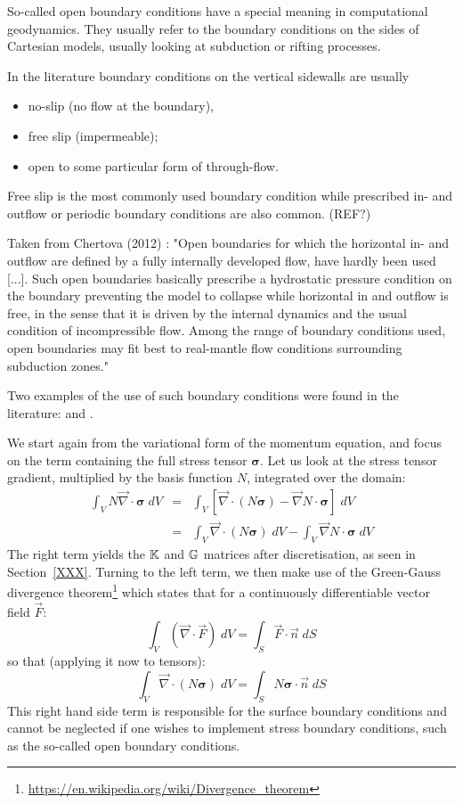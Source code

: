 So-called open boundary conditions have a special meaning in computational geodynamics. 
They usually refer to the boundary conditions on the sides of Cartesian models, 
usually looking at subduction or rifting processes. 

In the literature boundary conditions on the vertical sidewalls are usually 
\begin{itemize}
\item no-slip (no flow at the boundary), 
\item free slip (impermeable); 
\item open to some particular form of through-flow.
\end{itemize}

Free slip is the most commonly used boundary condition while prescribed in- and outflow 
or periodic boundary conditions are also common. (REF?)

Taken from Chertova \etal (2012) \cite{chgv12}:
"Open boundaries for which the horizontal in- and outflow are defined by a fully 
internally developed flow, have hardly been used [...]. 
Such open boundaries basically prescribe a hydrostatic pressure condition on 
the boundary preventing the model to collapse while horizontal in and outflow is free, 
in the sense that it is driven by the internal dynamics and the usual condition of 
incompressible flow. 
Among the range of boundary conditions used, open boundaries may fit best to 
real-mantle flow conditions surrounding subduction zones." 

Two examples of the use of such boundary conditions were found in 
the literature: \cite{qusp10} and \cite{chgv12}.

We start again from the variational form of the momentum equation, and focus on the term containing 
the full stress tensor ${\bm \sigma}$. 
Let us look at the stress tensor gradient, multiplied by the basis function $N$, integrated over the domain:
\begin{eqnarray}
\int_V N {\vec \nabla}\cdot {\bm \sigma} \; dV 
&=&\int_V \left[ {\vec \nabla}\cdot(N {\bm \sigma}) -{\vec \nabla}N \cdot {\bm \sigma}\right] \; dV \nonumber\\
&=& \int_V  {\vec \nabla}\cdot(N {\bm \sigma})\;  dV -\int_V  {\vec \nabla}N \cdot {\bm \sigma} \; dV
\end{eqnarray}
The right term yields the ${\mathbb{K}}$ and ${\mathbb{G}}$ matrices after discretisation, as seen in Section~\ref{XXX}.
Turning to the left term, we then make use of the Green-Gauss divergence 
theorem\footnote{\url{https://en.wikipedia.org/wiki/Divergence_theorem}} which states that for 
a continuously differentiable vector field $\vec{F}$:
\[
\int_V ({\vec \nabla} \cdot {\vec F})\; dV = \int _S {\vec F}\cdot {\vec n} \; dS
\]
so that (applying it now to tensors):
\[
\int_V  {\vec \nabla}\cdot(N {\bm \sigma})\;  dV =\int_S  N {\bm \sigma} \cdot {\vec n} \;  dS
\]
This right hand side term is responsible for the surface 
boundary conditions and cannot be neglected if one 
wishes to implement stress boundary conditions, 
such as the so-called open boundary conditions. 

